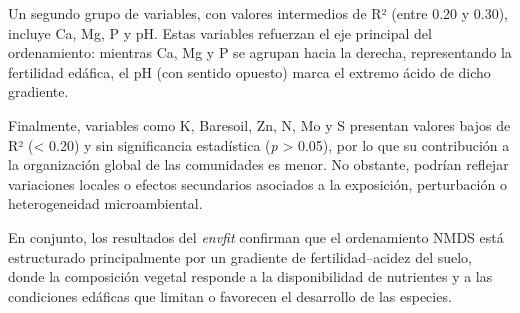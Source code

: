 \documentclass[
  spanish,
  11pt,
  a4paper,
  DIV=11,
  numbers=noendperiod]{scrartcl}
\begin{document}
Un segundo grupo de variables, con valores intermedios de R² (entre 0.20
y 0.30), incluye Ca, Mg, P y pH. Estas variables refuerzan el eje
principal del ordenamiento: mientras Ca, Mg y P se agrupan hacia la
derecha, representando la fertilidad edáfica, el pH (con sentido
opuesto) marca el extremo ácido de dicho gradiente.

Finalmente, variables como K, Baresoil, Zn, N, Mo y S presentan valores
bajos de R² (\textless{} 0.20) y sin significancia estadística (\emph{p}
\textgreater{} 0.05), por lo que su contribución a la organización
global de las comunidades es menor. No obstante, podrían reflejar
variaciones locales o efectos secundarios asociados a la exposición,
perturbación o heterogeneidad microambiental.

En conjunto, los resultados del \emph{envfit} confirman que el
ordenamiento NMDS está estructurado principalmente por un gradiente de
fertilidad--acidez del suelo, donde la composición vegetal responde a la
disponibilidad de nutrientes y a las condiciones edáficas que limitan o
favorecen el desarrollo de las especies.
\end{document}
